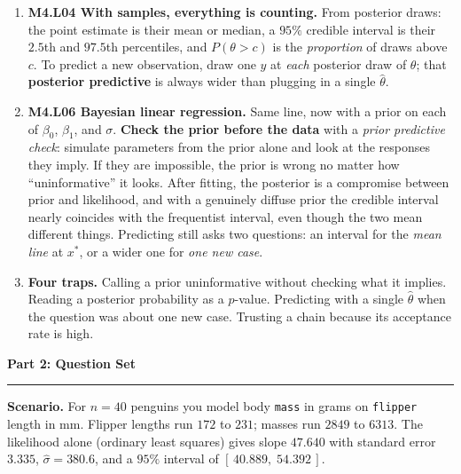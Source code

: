 \documentclass[11pt]{article}
\newcommand{\parttitle}[1]{%
  \par\medskip\noindent
  {\large\bfseries #1}\par
  \vspace{-.5em}\noindent\rule{\linewidth}{0.4pt}\par\smallskip}
\begin{document}
{\begin{enumerate}[label=\textbf{\arabic*.}, wide=0pt, itemsep=.4em, topsep=.5em]
\item \textbf{M4.L04 With samples, everything is counting.} From posterior draws: the point estimate
is their mean or median, a $95\%$ credible interval is their $2.5$th and $97.5$th percentiles, and
$P(\theta > c)$ is the \emph{proportion} of draws above $c$. To predict a new observation, draw one
$y$ at \emph{each} posterior draw of $\theta$; that \textbf{posterior predictive} is always wider
than plugging in a single $\hat\theta$.

\item \textbf{M4.L06 Bayesian linear regression.} Same line, now with a prior on each of
$\beta_0$, $\beta_1$, and $\sigma$. \textbf{Check the prior before the data} with a \emph{prior
predictive check}: simulate parameters from the prior alone and look at the responses they imply. If
they are impossible, the prior is wrong no matter how ``uninformative'' it looks. After fitting, the
posterior is a compromise between prior and likelihood, and with a genuinely diffuse prior the
credible interval nearly coincides with the frequentist interval, even though the two mean different
things. Predicting still asks two questions: an interval for the \emph{mean line} at $x^{\ast}$, or a
wider one for \emph{one new case}.

\item \textbf{Four traps.} Calling a prior uninformative without checking what it implies. Reading a
posterior probability as a $p$-value. Predicting with a single $\hat\theta$ when the question was
about one new case. Trusting a chain because its acceptance rate is high.

\end{enumerate}

}

\newpage

\parttitle{Part 2: Question Set}

\noindent\textbf{Scenario.} For $n = 40$ penguins you model body \texttt{mass} in grams on
\texttt{flipper} length in mm. Flipper lengths run $172$ to $231$; masses run $2849$ to $6313$. The
likelihood alone (ordinary least squares) gives slope $47.640$ with standard error $3.335$,
$\hat\sigma = 380.6$, and a $95\%$ interval of $[\,40.889,\; 54.392\,]$.
\end{document}
